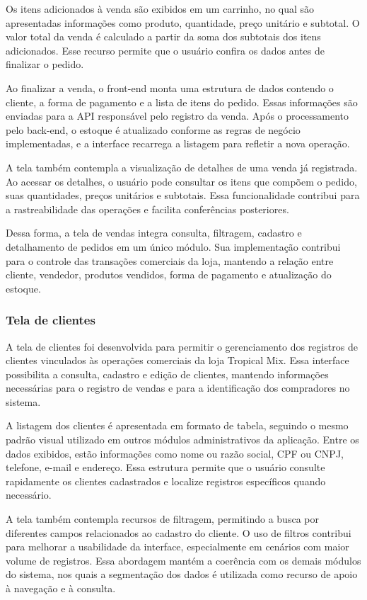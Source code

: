 Os itens adicionados à venda são exibidos em um carrinho, no qual são apresentadas informações como produto, quantidade, preço unitário e subtotal. O valor total da venda é calculado a partir da soma dos subtotais dos itens adicionados. Esse recurso permite que o usuário confira os dados antes de finalizar o pedido.

Ao finalizar a venda, o front-end monta uma estrutura de dados contendo o cliente, a forma de pagamento e a lista de itens do pedido. Essas informações são enviadas para a API responsável pelo registro da venda. Após o processamento pelo back-end, o estoque é atualizado conforme as regras de negócio implementadas, e a interface recarrega a listagem para refletir a nova operação.

A tela também contempla a visualização de detalhes de uma venda já registrada. Ao acessar os detalhes, o usuário pode consultar os itens que compõem o pedido, suas quantidades, preços unitários e subtotais. Essa funcionalidade contribui para a rastreabilidade das operações e facilita conferências posteriores.

Dessa forma, a tela de vendas integra consulta, filtragem, cadastro e detalhamento de pedidos em um único módulo. Sua implementação contribui para o controle das transações comerciais da loja, mantendo a relação entre cliente, vendedor, produtos vendidos, forma de pagamento e atualização do estoque.

\subsubsection{Tela de clientes}

A tela de clientes foi desenvolvida para permitir o gerenciamento dos registros de clientes vinculados às operações comerciais da loja Tropical Mix. Essa interface possibilita a consulta, cadastro e edição de clientes, mantendo informações necessárias para o registro de vendas e para a identificação dos compradores no sistema.

A listagem dos clientes é apresentada em formato de tabela, seguindo o mesmo padrão visual utilizado em outros módulos administrativos da aplicação. Entre os dados exibidos, estão informações como nome ou razão social, CPF ou CNPJ, telefone, e-mail e endereço. Essa estrutura permite que o usuário consulte rapidamente os clientes cadastrados e localize registros específicos quando necessário.

A tela também contempla recursos de filtragem, permitindo a busca por diferentes campos relacionados ao cadastro do cliente. O uso de filtros contribui para melhorar a usabilidade da interface, especialmente em cenários com maior volume de registros. Essa abordagem mantém a coerência com os demais módulos do sistema, nos quais a segmentação dos dados é utilizada como recurso de apoio à navegação e à consulta.

